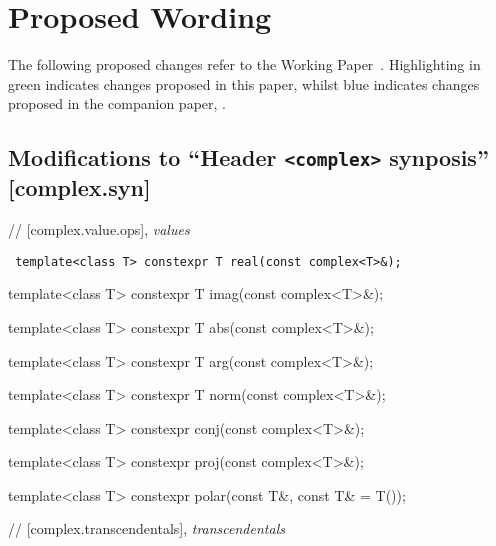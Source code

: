 \documentclass[prd,twocolumn,amsmath,amssymb,nofootinbib,eqsecnum]{revtex4-1}
\newcommand{\code}[1]{{\tt #1}}
\newcommand{\header}[1]{{\tt <#1>}}
\newcommand{\highlight}[1]{{\color{green} #1}}
\newcommand{\oldhighlight}[1]{{\color{blue} #1}}
\begin{document}
\newpage

\onecolumngrid

\section{Proposed Wording}

\setlength{\parindent}{0pt}


The following proposed changes refer to the Working Paper~\cite{WorkingPaper}. Highlighting in \highlight{green} indicates changes proposed in this paper, whilst \oldhighlight{blue} indicates changes proposed in the companion paper, \cite{Rosten-constexpr}.



\subsection{Modifications to ``Header \header{complex} synposis'' [complex.syn]}

// [complex.value.ops], {\it values }

\vspace{2ex}

\code{
  	template<class T> constexpr T real(const complex<T>\&);
	
  	template<class T> constexpr T imag(const complex<T>\&);

	\vspace{2ex}

	template<class T> \highlight{constexpr} T abs(const complex<T>\&);
 	
	template<class T> \highlight{constexpr} T arg(const complex<T>\&);
	
	template<class T> constexpr T norm(const complex<T>\&);
	
	\vspace{2ex}
	
	template<class T> constexpr conj(const complex<T>\&);
	
	template<class T> \highlight{constexpr} proj(const complex<T>\&);
	
	template<class T> \highlight{constexpr} polar(const T\&, const T\& = T());	

}

\vspace{2ex}

// [complex.transcendentals], {\it transcendentals}
\end{document}
